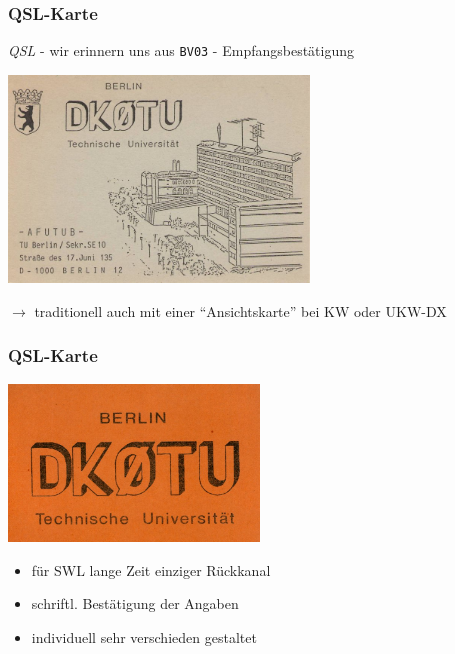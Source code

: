 \begin{frame}
    \frametitle{QSL-Karte}

    \emph{QSL} - wir erinnern uns aus \texttt{BV03} - Empfangsbestätigung \\[1em]

    \begin{center}
        \includegraphics[width=0.6\textwidth]{bv13/DK0TU_1.jpg}
    \end{center}

	$\rightarrow$ traditionell auch mit einer ``Ansichtskarte'' bei KW oder UKW-DX

\end{frame}

\begin{frame}
    \frametitle{QSL-Karte}

    \begin{center}
        \includegraphics[width=0.5\textwidth]{bv13/DK0TU_0.jpg}
    \end{center}

    \begin{itemize}
        \item für SWL lange Zeit einziger Rückkanal
        \item schriftl. Bestätigung der Angaben
        \item individuell sehr verschieden gestaltet
    \end{itemize}

\end{frame}

